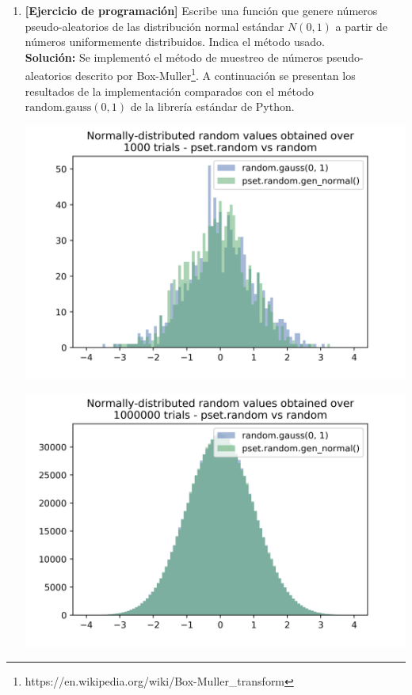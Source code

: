 \documentclass[10pt,letterpaper]{article}
\begin{document}
\begin{enumerate}
    \item \textbf{[Ejercicio de programación]} Escribe una función que genere números
          pseudo-aleatorios de las distribución normal estándar $N(0, 1)$ a partir de
          números uniformemente distribuidos. Indica el método usado. \\[\baselineskip]

        \textbf{Solución:} Se implementó el método de muestreo de números pseudo-aleatorios
        descrito por Box-Muller\footnote{https://en.wikipedia.org/wiki/Box-Muller\_transform}.
        A continuación se presentan los resultados de la implementación comparados con el
        método $\mathrm{random.gauss(0, 1)}$ de la librería estándar de Python.
        \begin{center}
            \includegraphics[scale=.6]{./assets/ex1-results1.png}
        \end{center}
        \begin{center}
            \includegraphics[scale=.6]{./assets/ex1-results2.png}
        \end{center}


\end{enumerate}
\end{document}
